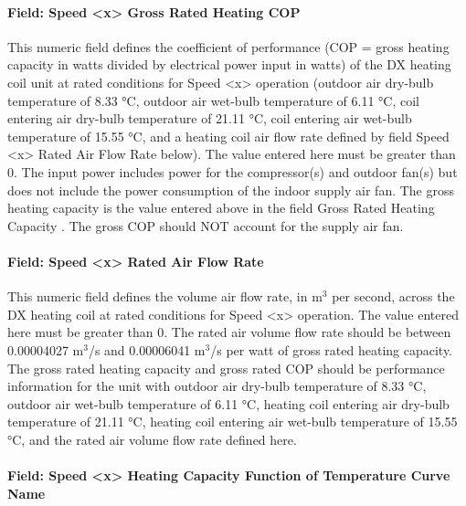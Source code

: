 \paragraph{Field: Speed \textless{}x\textgreater{} Gross Rated Heating COP}\label{field-speed-x-gross-rated-heating-cop}

This numeric field defines the coefficient of performance (COP = gross heating capacity in watts divided by electrical power input in watts) of the DX heating coil unit at rated conditions for Speed \textless{}x\textgreater{} operation (outdoor air dry-bulb temperature of 8.33 °C, outdoor air wet-bulb temperature of 6.11 °C, coil entering air dry-bulb temperature of 21.11 °C, coil entering air wet-bulb temperature of 15.55 °C, and a heating coil air flow rate defined by field Speed \textless{}x\textgreater{} Rated Air Flow Rate below). The value entered here must be greater than 0. The input power includes power for the compressor(s) and outdoor fan(s) but does not include the power consumption of the indoor supply air fan. The gross heating capacity is the value entered above in the field Gross Rated Heating Capacity . The gross COP should NOT account for the supply air fan.

\paragraph{Field: Speed \textless{}x\textgreater{} Rated Air Flow Rate}\label{field-speed-x-rated-air-flow-rate-1}

This numeric field defines the volume air flow rate, in m\(^{3}\) per second, across the DX heating coil at rated conditions for Speed \textless{}x\textgreater{} operation. The value entered here must be greater than 0. The rated air volume flow rate should be between 0.00004027 m\(^{3}\)/s and 0.00006041 m\(^{3}\)/s per watt of gross rated heating capacity. The gross rated heating capacity and gross rated COP should be performance information for the unit with outdoor air dry-bulb temperature of 8.33 °C, outdoor air wet-bulb temperature of 6.11 °C, heating coil entering air dry-bulb temperature of 21.11 °C, heating coil entering air wet-bulb temperature of 15.55 °C, and the rated air volume flow rate defined here.

\paragraph{Field: Speed \textless{}x\textgreater{} Heating Capacity Function of Temperature Curve Name}\label{field-speed-x-heating-capacity-function-of-temperature-curve-name}

